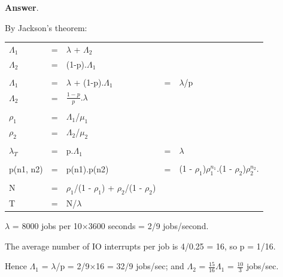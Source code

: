 \documentclass[12pt,fleqn]{report}
\begin{document}
\noindent
{\bf Answer}.

By Jackson's theorem:

\begin{center}
\begin{tabular}{l c l c l }
$\Lambda_1$ & = & $\lambda$ + $\Lambda_2$\\
$\Lambda_2$ & = & (1-p).$\Lambda_1$ \\
&&\\
$\Lambda_1$ & = & $\lambda$ + (1-p).$\Lambda_1$   & = & $\lambda$/p\\
$\Lambda_2$ & = & $\frac{1-p}{p}$.$\lambda$ \\
&&\\
$\rho_1$ & = & $\Lambda_1$/$\mu_1$ \\
$\rho_2$ & = & $\Lambda_2$/$\mu_2$ \\
&&\\
$\lambda_T$ & = & p.$\Lambda_1$                   & = & $\lambda$      \\
&&\\
p(n1, n2) & = & p(n1).p(n2) 
      & = & (1 - $\rho_1$)$\rho_1^{n_1}$.(1 - $\rho_2$)$\rho_2^{n_2}$.\\
&&\\
N     & = & $\rho_1$/(1 - $\rho_1$) +  $\rho_2$/(1 - $\rho_2$) \\
T     & = & N/$\lambda$ \\
\end{tabular}
\end{center}

\noindent
$\lambda$ = 8000 jobs per 10$\times$3600 seconds = 2/9 jobs/second.

The average number of IO interrupts per job is 4/0.25 = 16, so p = 1/16.

Hence $\Lambda_1$ = $\lambda$/p = 2/9$\times$16 = 32/9 jobs/sec;
and $\Lambda_2$ = $\frac{15}{16}$$\Lambda_1$ = $\frac{10}{3}$ jobs/sec.
\end{document}
